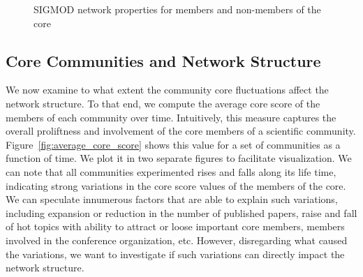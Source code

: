\begin{figure}[!htb]
\begin{center}
{  }%
  \end{center}
  \caption{SIGMOD network properties for members and non-members of the core}
  \label{fig:metrics_comparing_core_community}
\end{figure}



\subsection{Core Communities and Network Structure}
\label{sub:corr}

We now examine to what extent the community core fluctuations affect the network structure.  To that end, we compute the average core score of the members of each community over
time. Intuitively, this measure captures the overall proliftness and involvement of the core members of a scientific community. Figure~\ref{fig:average_core_score} shows this value
for a set of communities as a function of time. We plot it in two separate figures to facilitate visualization. We can note that all communities experimented rises and falls along
its life time, indicating strong variations in the core score values of the members of the core. We can speculate innumerous factors that are able to explain such variations,
including expansion or reduction in the number of published papers, raise and fall of hot topics with ability to attract or loose important core members, members involved in the
conference organization, etc. However, disregarding what caused the variations, we want to investigate if such variations can directly impact the network structure.


